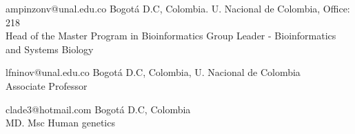 

{ampinzonv@unal.edu.co}
{Bogotá D.C, Colombia. U. Nacional de Colombia, Office: 218}
 \\
Head of the Master Program in Bioinformatics
Group Leader - Bioinformatics and Systems Biology 
\\
\divider

{lfninov@unal.edu.co}
{Bogotá D.C, Colombia, U. Nacional de Colombia}
 \\
Associate Professor
\\
\divider

{clade3@hotmail.com}
{Bogotá D.C, Colombia}
 \\
MD. Msc Human genetics
\\
\divider


